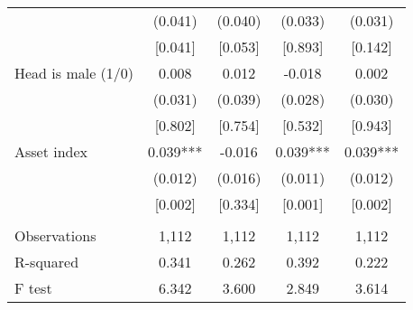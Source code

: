 \documentclass[]{article}
\begin{document}
\begin{tabular}{lcccc}
 & (0.041) & (0.040) & (0.033) & (0.031) \\
 & [0.041] & [0.053] & [0.893] & [0.142] \\
Head is male (1/0) & 0.008 & 0.012 & -0.018 & 0.002 \\
 & (0.031) & (0.039) & (0.028) & (0.030) \\
 & [0.802] & [0.754] & [0.532] & [0.943] \\
Asset index & 0.039*** & -0.016 & 0.039*** & 0.039*** \\
 & (0.012) & (0.016) & (0.011) & (0.012) \\
 & [0.002] & [0.334] & [0.001] & [0.002] \\
 &  &  &  &  \\
Observations & 1,112 & 1,112 & 1,112 & 1,112 \\
R-squared & 0.341 & 0.262 & 0.392 & 0.222 \\
 F test & 6.342 & 3.600 & 2.849 & 3.614 \\ \hline
\end{tabular}
\end{document}

